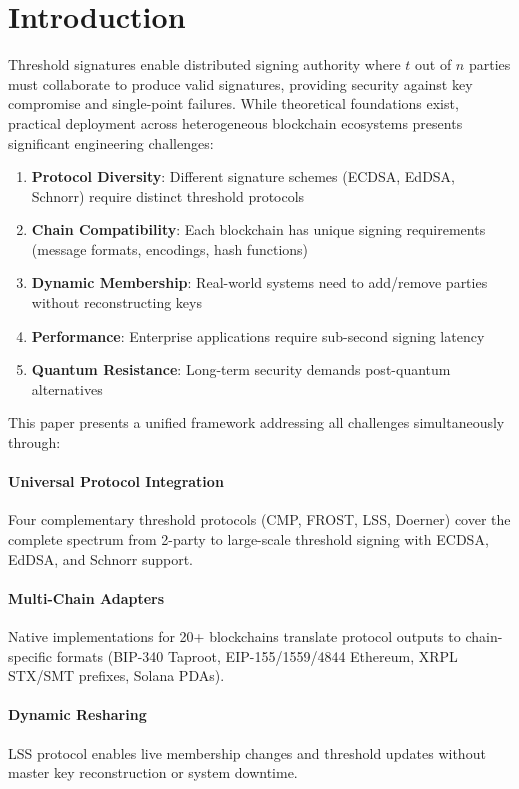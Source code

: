 \section{Introduction}


Threshold signatures enable distributed signing authority where $t$ out of $n$ parties must collaborate to produce valid signatures, providing security against key compromise and single-point failures. While theoretical foundations exist, practical deployment across heterogeneous blockchain ecosystems presents significant engineering challenges:

\begin{enumerate}
\item \textbf{Protocol Diversity}: Different signature schemes (ECDSA, EdDSA, Schnorr) require distinct threshold protocols
\item \textbf{Chain Compatibility}: Each blockchain has unique signing requirements (message formats, encodings, hash functions)
\item \textbf{Dynamic Membership}: Real-world systems need to add/remove parties without reconstructing keys
\item \textbf{Performance}: Enterprise applications require sub-second signing latency
\item \textbf{Quantum Resistance}: Long-term security demands post-quantum alternatives
\end{enumerate}

This paper presents a unified framework addressing all challenges simultaneously through:

\paragraph{Universal Protocol Integration} Four complementary threshold protocols (CMP, FROST, LSS, Doerner) cover the complete spectrum from 2-party to large-scale threshold signing with ECDSA, EdDSA, and Schnorr support.

\paragraph{Multi-Chain Adapters} Native implementations for 20+ blockchains translate protocol outputs to chain-specific formats (BIP-340 Taproot, EIP-155/1559/4844 Ethereum, XRPL STX/SMT prefixes, Solana PDAs).

\paragraph{Dynamic Resharing} LSS protocol enables live membership changes and threshold updates without master key reconstruction or system downtime.

